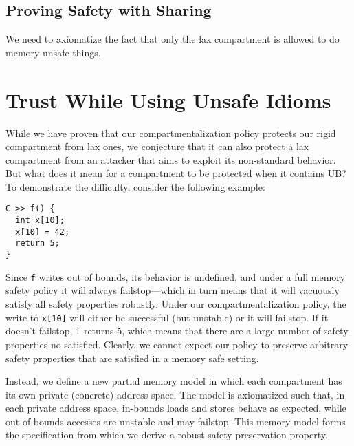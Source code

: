 \documentclass{article}
\begin{document}
\subsection{Proving Safety with Sharing}

We need to axiomatize the fact that only the lax compartment is allowed to
do memory unsafe things.

\section{Trust While Using Unsafe Idioms}

While we have proven that our compartmentalization policy protects our rigid
compartment from lax ones, we conjecture that it can also protect a lax compartment
from an attacker that aims to exploit its non-standard behavior. But what does it mean
for a compartment to be protected when it contains UB? To demonstrate the difficulty,
consider the following example:

\begin{verbatim}
C >> f() {
  int x[10];
  x[10] = 42;
  return 5;
}
\end{verbatim}

Since {\tt f} writes out of bounds, its behavior is undefined, and under a full memory safety
policy it will always failstop---which in turn means that it will vacuously satisfy all safety
properties robustly. Under our compartmentalization policy, the write to {\tt x[10]} will either
be successful (but unstable) or it will failstop. If it doesn't failstop, {\tt f} returns 5,
which means that there are a large number of safety properties no satisfied. Clearly,
we cannot expect our policy to preserve arbitrary safety properties that are satisfied in
a memory safe setting.

Instead, we define a new partial memory model in which each compartment has its own private
(concrete) address space. The model is axiomatized such that, in each private address space,
in-bounds loads and stores behave as expected, while out-of-bounds accesses are unstable and
may failstop. This memory model forms the specification from which we derive a robust
safety preservation property.


\end{document}
